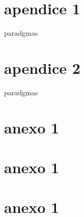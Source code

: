 \documentclass[
	12pt,				%
	openright,			%
	twoside,			%
	a4paper,			%
	english,			%
	brazil,				%
	]{abntex2}
\begin{document}
\begin{apendicesenv}

\chapter{apendice 1}

paradgmas

\chapter{apendice 2}

paradgmas

\end{apendicesenv}



\begin{anexosenv}


\chapter{anexo 1}


\chapter{anexo 1}


\chapter{anexo 1}


\end{anexosenv}


\printindex
\end{document}
